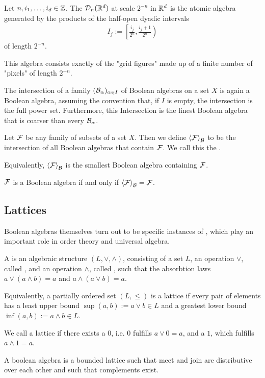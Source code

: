 \begin{theorem}
	 Let $n, i_1, \hdots, i_d \in \mathbb{Z}$. The  $\mathcal{D}_n(\mathbb{R}^d)$ at scale $2^{-n}$ in $\mathbb{R}^d$ is the atomic algebra generated by the products of the half-open dyadic intervals
	\begin{align*}
		I_j := \left[\frac{i_j}{2^n}, \frac{i_j +1}{2^n} \right)
	\end{align*}
	of length $2^{-n}$.
\end{theorem}
This algebra consists exactly of the "grid figures" made up of a finite number of "pixels" of length $2^{-n}$.
\begin{theorem}
	 The intersection of a family $(\mathcal{B}_\alpha)_{\alpha \in I}$ of Boolean algebras on a set $X$ is again a Boolean algebra, assuming the convention that, if $I$ is empty, the intersection is the full power set.  Furthermore, this Intersection is the finest Boolean algebra that is coarser than every $\mathcal{B}_\alpha$.
\end{theorem}
\begin{definition}
	Let $\mathcal{F}$ be any family of subsets of a set $X$. Then we define $\left\langle \mathcal{F} \right\rangle_{\mathcal{B}}$ to be the intersection of all Boolean algebras that contain $\mathcal{F}$. We call this the .
\end{definition}
Equivalently, $\left\langle \mathcal{F} \right\rangle_{\mathcal{B}}$ is the smallest Boolean algebra containing $\mathcal{F}$.
\begin{theorem}
	$\mathcal{F}$ is a Boolean algebra if and only if $\left\langle \mathcal{F} \right\rangle_{\mathcal{B}} = \mathcal{F}$.
\end{theorem}
\subsection{Lattices}
Boolean algebras themselves turn out to be specific instances of , which play an important role in order theory and universal algebra.
\begin{definition}
	A  is an algebraic structure $(L,\vee,\wedge)$, consisting of a set $L$, an operation $\vee$, called , and an operation $\wedge$, called , such that the absorbtion laws $a \vee (a \wedge b) = a$ and $a \wedge (a \vee b) = a$. 
\end{definition}
\begin{proposition}
	Equivalently, a partially ordered set $(L,\leq)$ is a lattice if every pair of elements has a least upper bound $\sup(a,b) := a \vee b \in L$ and a greatest lower bound $\inf(a,b) := a \wedge b \in L$.
\end{proposition}
\begin{definition}
	We call a lattice  if there exists a  $0$, i.e. $0$ fulfills $a \vee 0 = a$, and a  $1$, which fulfills $a \wedge 1 = a$.
\end{definition}
\begin{corollary}
	A boolean algebra is a bounded lattice such that meet and join are distributive over each other and such that complements exist.
\end{corollary}

